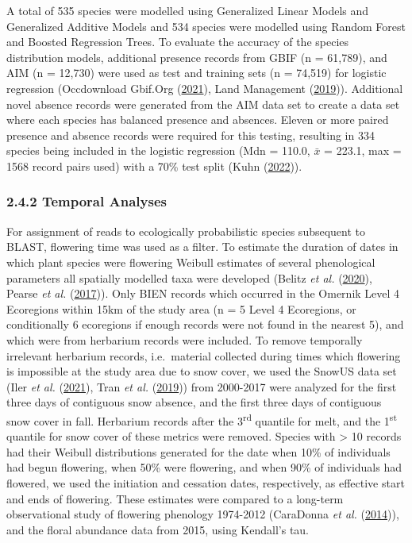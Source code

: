 \documentclass[
]{article}
\begin{document}
A total of 535 species were modelled using Generalized Linear Models and
Generalized Additive Models and 534 species were modelled using Random
Forest and Boosted Regression Trees. To evaluate the accuracy of the
species distribution models, additional presence records from GBIF (n =
61,789), and AIM (n = 12,730) were used as test and training sets (n =
74,519) for logistic regression (Occdownload Gbif.Org
(\protect\hyperlink{ref-gbifDL2021sdms}{2021}), Land Management
(\protect\hyperlink{ref-aim2019database}{2019})). Additional novel
absence records were generated from the AIM data set to create a data
set where each species has balanced presence and absences. Eleven or
more paired presence and absence records were required for this testing,
resulting in 334 species being included in the logistic regression (Mdn
= 110.0, \(\bar{x}\) = 223.1, max = 1568 record pairs used) with a 70\%
test split (Kuhn (\protect\hyperlink{ref-caret}{2022})).

\hypertarget{temporal-analyses}{%
\subsubsection{2.4.2 \textbar{} Temporal
Analyses}\label{temporal-analyses}}

For assignment of reads to ecologically probabilistic species subsequent
to BLAST, flowering time was used as a filter. To estimate the duration
of dates in which plant species were flowering Weibull estimates of
several phenological parameters all spatially modelled taxa were
developed (Belitz \emph{et al.}
(\protect\hyperlink{ref-belitz2020accuracy}{2020}), Pearse \emph{et al.}
(\protect\hyperlink{ref-pearse2017statistical}{2017})). Only BIEN
records which occurred in the Omernik Level 4 Ecoregions within 15km of
the study area (n = 5 Level 4 Ecoregions, or conditionally 6 ecoregions
if enough records were not found in the nearest 5), and which were from
herbarium records were included. To remove temporally irrelevant
herbarium records, i.e.~material collected during times which flowering
is impossible at the study area due to snow cover, we used the SnowUS
data set (Iler \emph{et al.}
(\protect\hyperlink{ref-iler2021conceptual}{2021}), Tran \emph{et al.}
(\protect\hyperlink{ref-tran2019cloud}{2019})) from 2000-2017 were
analyzed for the first three days of contiguous snow absence, and the
first three days of contiguous snow cover in fall. Herbarium records
after the 3\textsuperscript{rd} quantile for melt, and the
1\textsuperscript{st} quantile for snow cover of these metrics were
removed. Species with \textgreater{} 10 records had their Weibull
distributions generated for the date when 10\% of individuals had begun
flowering, when 50\% were flowering, and when 90\% of individuals had
flowered, we used the initiation and cessation dates, respectively, as
effective start and ends of flowering. These estimates were compared to
a long-term observational study of flowering phenology 1974-2012
(CaraDonna \emph{et al.}
(\protect\hyperlink{ref-caradonna2014shifts}{2014})), and the floral
abundance data from 2015, using Kendall's tau.
\end{document}
